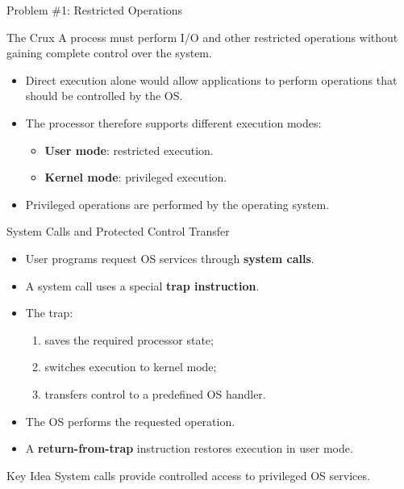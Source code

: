 \begin{frame}{Problem \#1: Restricted Operations}

\begin{block}{The Crux}
A process must perform I/O and other restricted operations
without gaining complete control over the system.
\end{block}

\begin{itemize}
    \item Direct execution alone would allow applications to perform
          operations that should be controlled by the OS.
    \item The processor therefore supports different execution modes:
    \begin{itemize}
        \item \textbf{User mode}: restricted execution.
        \item \textbf{Kernel mode}: privileged execution.
    \end{itemize}
    \item Privileged operations are performed by the operating system.
\end{itemize}

\end{frame}

\begin{frame}{System Calls and Protected Control Transfer}

\begin{itemize}
    \item User programs request OS services through
          \textbf{system calls}.
    \item A system call uses a special \textbf{trap instruction}.
    \item The trap:
    \begin{enumerate}
        \item saves the required processor state;
        \item switches execution to kernel mode;
        \item transfers control to a predefined OS handler.
    \end{enumerate}
    \item The OS performs the requested operation.
    \item A \textbf{return-from-trap} instruction restores execution
          in user mode.
\end{itemize}

\begin{block}{Key Idea}
System calls provide controlled access to privileged OS services.
\end{block}

\end{frame}

